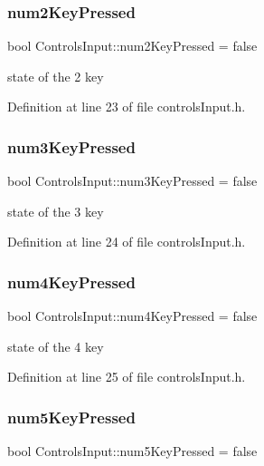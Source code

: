 \subsubsection{\texorpdfstring{num2\+Key\+Pressed}{num2KeyPressed}}
{\footnotesize\ttfamily bool Controls\+Input\+::num2\+Key\+Pressed = false}

state of the 2 key 

Definition at line 23 of file controls\+Input.\+h.

\mbox{\label{struct_controls_input_a2b422f2d084970ac09c6a9b68aa03e22}} 
\subsubsection{\texorpdfstring{num3\+Key\+Pressed}{num3KeyPressed}}
{\footnotesize\ttfamily bool Controls\+Input\+::num3\+Key\+Pressed = false}

state of the 3 key 

Definition at line 24 of file controls\+Input.\+h.

\mbox{\label{struct_controls_input_aec8b1eccecbae03406e12a87b12520d9}} 
\subsubsection{\texorpdfstring{num4\+Key\+Pressed}{num4KeyPressed}}
{\footnotesize\ttfamily bool Controls\+Input\+::num4\+Key\+Pressed = false}

state of the 4 key 

Definition at line 25 of file controls\+Input.\+h.

\mbox{\label{struct_controls_input_aaf569ad5596dbb778880703879bbc765}} 
\subsubsection{\texorpdfstring{num5\+Key\+Pressed}{num5KeyPressed}}
{\footnotesize\ttfamily bool Controls\+Input\+::num5\+Key\+Pressed = false}

